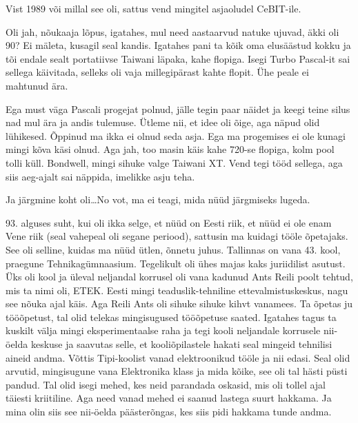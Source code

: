 Vist 1989 või millal see oli, sattus vend mingitel asjaoludel CeBIT-ile. 


Oli jah, nõukaaja lõpus, igatahes, mul need aastaarvud natuke ujuvad, äkki oli 90? Ei mäleta, kusagil seal kandis. Igatahes pani ta kõik oma elusäästud kokku ja tõi endale sealt portatiivse Taiwani läpaka, kahe flopiga. Isegi Turbo Pascal-it sai sellega käivitada, selleks oli vaja millegipärast kahte flopit. Ühe peale ei mahtunud ära. 

Ega must väga Pascali progejat polnud, jälle  tegin paar näidet  ja keegi teine silus nad mul ära ja andis tulemuse. Ütleme nii, et idee oli õige, aga  näpud olid lühikesed. Õppinud ma ikka ei olnud seda asja. Ega ma progemises ei ole kunagi mingi kõva käsi olnud. Aga jah, too masin käis kahe 720-se flopiga,  kolm pool tolli küll. Bondwell, mingi sihuke valge Taiwani XT. Vend tegi tööd sellega, aga siis aeg-ajalt sai näppida, imelikke asju teha. 

Ja järgmine koht oli\ldots No vot, ma ei teagi, mida nüüd järgmiseks lugeda. 

93. alguses suht, kui oli ikka selge, et nüüd on Eesti riik, et nüüd ei ole enam Vene riik (seal vahepeal oli segane periood), sattusin ma kuidagi tööle õpetajaks. See oli selline, kuidas ma nüüd ütlen, õnnetu juhus. Tallinnas on vana 43. kool, praegune Tehnikagümnaasium\label{sisu:43kool}. Tegelikult oli ühes majas kaks juriidilist asutust. Üks oli kool ja  üleval neljandal korrusel oli vana kadunud Ants Reili poolt tehtud, mis ta nimi oli, ETEK. Eesti mingi teaduslik-tehniline ettevalmistuskeskus, nagu see nõuka ajal käis. Aga Reili Ants oli  sihuke sihuke kihvt vanamees. Ta õpetas ju tööõpetust, tal olid telekas mingisugused tööõpetuse saated. Igatahes  tagus ta kuskilt välja mingi eksperimentaalse raha ja tegi kooli neljandale korrusele nii-öelda keskuse ja saavutas selle, et kooliõpilastele hakati seal mingeid tehnilisi aineid andma. Võttis Tipi-koolist vanad elektroonikud  tööle ja nii edasi. Seal olid arvutid, mingisugune vana Elektronika klass ja mida kõike, see oli tal hästi püsti pandud. Tal olid isegi mehed, kes neid parandada oskasid, mis oli tollel ajal täiesti kriitiline. Aga need vanad mehed ei saanud lastega suurt hakkama. Ja mina olin siis see nii-öelda päästerõngas, kes siis pidi hakkama tunde andma. 

